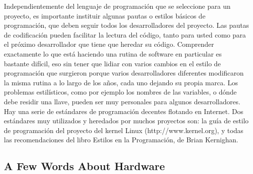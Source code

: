 \documentclass[output=paper, 
colorlinks,
citecolor=brown,
newtxmath
]{langscibook}
\begin{document}
Independientemente del lenguaje de programación que se seleccione 
para un proyecto, es importante instituir algunas pautas 
o estilos básicos de programación, que deben seguir todos 
los desarrolladores del proyecto. 
Las pautas de codificación pueden facilitar la lectura del código, 
tanto para usted como para el próximo desarrollador que 
tiene que heredar su código. Comprender exactamente lo que está 
haciendo una rutina de software en particular es bastante difícil,
eso sin tener que lidiar con varios cambios en el estilo de programación
que surgieron porque varios desarrolladores diferentes modificaron
la misma rutina a lo largo de los años, cada uno dejando su propia marca. 
Los problemas estilísticos, como por ejemplo los nombres de las
variables, o dónde debe residir una llave, pueden ser 
muy personales para algunos desarrolladores.
Hay una serie de estándares de programación decentes flotando en Internet. 
Dos estándares muy utilizados y heredados por muchos proyectos son: 
la guía de estilo de programación del proyecto del kernel Linux (http://www.kernel.org),
y todas las recomendaciones del libro Estilos en la Programación, de Brian Kernighan.




\subsection {A Few Words About Hardware}
\end{document}
